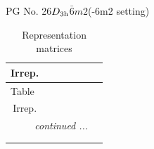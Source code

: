 \documentclass[fleqn,8pt,landscape]{jsarticle}
\begin{document}
\setcounter{MaxMatrixCols}{32}

\renewcommand{\tablename}{Table~}
\renewcommand{\figurename}{Figure~}
\begin{center}
\LARGE
PG No. 26\quad$D_{\rm 3h}$\quad$\bar{6}m2$\quad(-6m2 setting)\quad[ hexagonal ]
\end{center}
\renewcommand{\arraystretch}{1.2}
\begin{longtable}{ccccccc}
\caption{Representation matrices}
 \\
 \hline \hline
Irrep. &  &  &  &  &  &  \\ \hline \endfirsthead

\multicolumn{6}{l}{\tablename\ \thetable{}} \\
 \hline \hline
Irrep. &  &  &  &  &  &  \\ \hline \endhead

 \hline \hline
\multicolumn{6}{r}{\footnotesize\it continued ...} \\ \endfoot

 \hline \hline
\multicolumn{6}{r}{} \\ \endlastfoot


\end{longtable}
\end{document}
